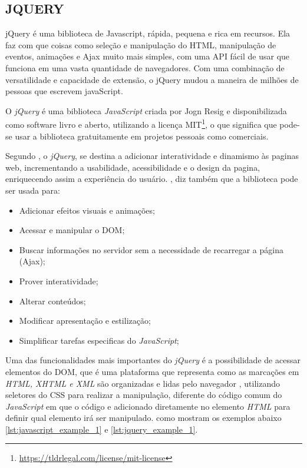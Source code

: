 \subsection{JQUERY}

\begin{citacao}
    jQuery é uma biblioteca de Javascript, rápida, pequena e rica em recursos. Ela faz com que coisas como seleção e manipulação do HTML, manipulação de eventos, animações e Ajax muito mais simples, com uma API fácil de usar que funciona em uma vasta quantidade de navegadores. Com uma combinação de versatilidade e capacidade de extensão, o jQuery mudou a maneira de milhões de pessoas que escrevem javaScript. \cite[tradução nossa]{jquery}
\end{citacao}
\par
O \textit{jQuery} é uma biblioteca \textit{JavaScript} criada por Jogn Resig e disponibilizada como software livro e aberto, utilizando a licença \ac{MIT}\footnote{\url{https://tldrlegal.com/license/mit-license}}, o que significa que pode-se usar a biblioteca gratuitamente em projetos pessoais como comerciais.
\par
Segundo \cite[p.~4]{silva-jquery}, o \textit{jQuery}, se destina a adicionar interatividade e dinamismo às paginas web, incrementando a usabilidade, acessibilidade e o design da pagina, enriquecendo assim a experiência do usuário. , diz também que a biblioteca pode ser usada para: 
\begin{itemize}
    \item Adicionar efeitos visuais e animações;
    \item Acessar e manipular o DOM;
    \item Buscar informações no servidor sem a necessidade de recarregar a página (Ajax);
    \item Prover interatividade;
    \item Alterar conteúdos;
    \item Modificar apresentação e estilização;
    \item Simplificar tarefas especificas do \textit{JavaScript};
\end{itemize}
\par
Uma das funcionalidades mais importantes do \textit{jQuery} é a possibilidade de acessar elementos do \ac{DOM}, que é uma plataforma que representa como as marcações em \textit{HTML, XHTML e XML} são organizadas e lidas pelo navegador \cite{franklin-dom}, utilizando seletores do \ac{CSS} para realizar a manipulação, diferente do código comum do \textit{JavaScript} em que o código e adicionado diretamente no elemento \textit{HTML} para definir qual elemento irá ser manipulado. como mostram os exemplos abaixo \ref{lst:javascript_example_1} e \ref{lst:jquery_example_1}.
